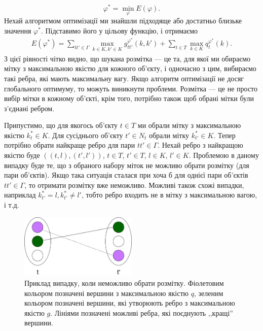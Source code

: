 \begin{equation}
    \varphi^* = \min_{\varphi} E(\varphi).
\end{equation}
Нехай алгоритмом оптимізації ми знайшли підходяще або достатньо близьке
значення $\varphi^*$. Підставимо його у цільову функцію, і отримаємо
\begin{equation}
    \begin{aligned}
    E(\varphi^*) =
    \sum\limits_{tt'\in\Gamma}\max\limits_{k\in K, k'\in K}g^{\varphi^*}_{tt'}(k,k') + 
    \sum\limits_{t\in T}\max\limits_{k\in K}q^{\varphi^*}_t(k).
\end{aligned}
\end{equation}
З цієї рівності чітко видно, що шукана розмітка --- це та, для якої ми обираємо мітку з
максимальною якістю для кожного об'єкту, і одночасно з цим, вибираємо такі ребра, які мають
максимальну вагу. Якщо алгоритм оптимізації не досяг глобального оптимуму, то 
можуть виникнути проблеми. Розмітка --- це не просто вибір мітки в кожному об'єкті, 
крім того, потрібно також щоб обрані мітки були з'єднані ребром. 

Припустимо, що
для якогось об'єкту $t\in T$ ми обрали мітку з максимальною якістю $k_t^*\in K$.
Для сусіднього об'єкту $t'\in N_t$ обрали мітку $k_{t'}^*\in K$. Тепер потрібно 
обрати найкраще ребро для пари $tt'\in\Gamma$. Нехай ребро з найкращою якістю
буде $((t,l),(t',l'))$, $t\in T$, $t'\in T$, $l\in K$, $l'\in K$. Проблемою в даному випадку
буде те, що з обраного набору міток не можливо обрати розмітку (для пари об'єктів).
Якщо така ситуація сталася при хоча б для однієї пари об'єктів $tt'\in\Gamma$, то 
отримати розмітку вже неможливо. Можливі також схожі випадки, наприклад 
$k_{t'}^*=l, k_{t'}^*\neq l'$, тобто ребро входить не в мітку з максимальною
вагою, і т.д.
\begin{figure}[h]
    \centering
    \includegraphics[width=0.5\textwidth]{images/multiple_choice.jpg}
    \caption{Приклад випадку, коли неможливо обрати розмітку. Фіолетовим кольором
    позначені вершини з максимальною якістю $q$, зеленим кольором позначені вершини, які
    утворюють ребро з максимальною якістю $g$. Лініями позначені можливі ребра,
    які поєднують ,,кращі'' вершини.}
    \label{fig:graph_example}
  \end{figure}

